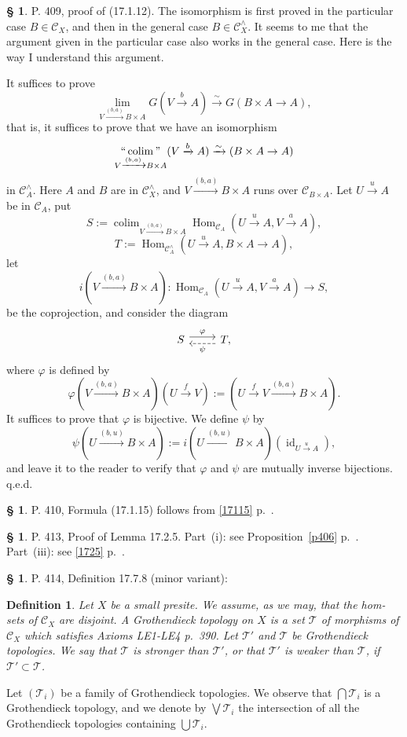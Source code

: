 \documentclass[12pt]{article}
\newtheorem{df}[thm]{Definition}%
\theoremstyle{remark}
\theoremstyle{definition}
\newtheorem{s}[thm]{\S}
\newcommand{\cc}{\mathcal}
\newcommand{\C}{\mathcal C}
\newcommand{\xr}{\xrightarrow}
\newcommand{\mv}{ (minor variant)}
\DeclareMathOperator*{\coli}{colim}
\DeclareMathOperator*{\co}{colim}
\DeclareMathOperator*{\ic}{``\coli"}
\DeclareMathOperator{\id}{id}
\DeclareMathOperator{\Hom}{Hom}%
\begin{document}
\begin{s} 
P. 409, proof of (17.1.12). The isomorphism is first proved in the particular case $B\in\C_X$, and then in the general case $B\in\C_X^\wedge$. It seems to me that the argument given in the particular case also works in the general case. Here is the way I understand this argument. 

It suffices to prove 
$$
\lim_{V\xr{(b,a)}B\times A}G(V\xr b A)\xr\sim G(B\times A\to A),
$$
that is, it suffices to prove that we have an isomorphism 
$$
\ic_{V\xr{(b,a)}B\times A}(V\xr b A)\xr\sim(B\times A\to A)
$$ 
in $\C_A^\wedge$. Here $A$ and $B$ are in $\C_X^\wedge$, and $V\xr{(b,a)}B\times A$ runs over $\C_{B\times A}$. Let $U\xr u A$ be in $\C_A$, put 
$$
S:=\displaystyle\co_{V\xr{(b,a)}B\times A}\Hom_{\C_A}(U\xr u A,V\xr a A),
$$ 
$$
T:=\Hom_{\C_A^\wedge}(U\xr u A,B\times A\to A),
$$ 
let 
$$
i(V\xr{(b,a)}B\times A):\Hom_{\C_A}(U\xr u A,V\xr a A)\to S,
$$ 
be the coprojection, and consider the diagram 
$$
\begin{tikzcd}
%
S\ar[yshift=.7ex]{r}{\varphi}&T,\ar[yshift=-.7ex,dashed]{l}{\psi}
%
\end{tikzcd}
$$ 
where $\varphi$ is defined by 
$$
\varphi(V\xr{(b,a)}B\times A)(U\xr fV):=(U\xr fV\xr{(b,a)}B\times A).
$$
It suffices to prove that $\varphi$ is bijective. We define $\psi$ by 
$$
\psi(U\xr{(b,u)}B\times A):=i(U\xr{(b,u)}B\times A)(\id_{U\xr uA}),
$$ 
and leave it to the reader to verify that $\varphi$ and $\psi$ are mutually inverse bijections. q.e.d.
\end{s}
%
%
\begin{s}\label{17115b}
P. 410, Formula (17.1.15) follows from \eqref{17115} p.~\pageref{17115}.
\end{s}
%
%
\begin{s}\label{1725b}
P. 413, Proof of Lemma 17.2.5. Part~(i): see Proposition~\ref{p406} p.~\pageref{p406}. Part~(iii): see \eqref{1725} p.~\pageref{1725}.
\end{s}
%
%
\begin{s} 
P. 414, Definition 17.7.8\mv:
%
\begin{df}\label{1778}
Let $X$ be a small presite. We assume, as we may, that the hom-sets of $\C_X$ are disjoint. A {\em Grothendieck topology} on $X$ is a set $\cc T$ of morphisms of $\C_X$ which satisfies Axioms LE1-LE4 p.~390. Let $\cc T'$ and $\cc T$ be Grothendieck topologies. We say that $\cc T$ is {\em stronger than} $\cc T'$, or that $\cc T'$ is {\em weaker than} $\cc T$, if $\cc T'\subset\cc T$. 
\end{df}
%
Let $(\cc T_i)$ be a family of Grothendieck topologies. We observe that $\bigcap\cc T_i$ is a Grothendieck topology, and we denote by $\bigvee\cc T_i$ the intersection of all the Grothendieck topologies containing $\bigcup\cc T_i$.
\end{s}
\end{document}
